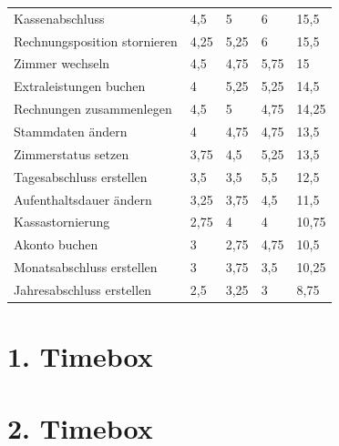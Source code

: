\documentclass[a4paper,12pt,twoside]{scrreprt}
\begin{document}
\begin{longtable}{|l|l|l|l|l|}
            Kassenabschluss              & 4,5               & 5                      & 6                   & 15,5   \\
            Rechnungsposition stornieren & 4,25              & 5,25                   & 6                   & 15,5   \\
            Zimmer wechseln              & 4,5               & 4,75                   & 5,75                & 15     \\
            Extraleistungen buchen       & 4                 & 5,25                   & 5,25                & 14,5   \\
            Rechnungen zusammenlegen     & 4,5               & 5                      & 4,75                & 14,25  \\
            Stammdaten ändern            & 4                 & 4,75                   & 4,75                & 13,5   \\
            Zimmerstatus setzen          & 3,75              & 4,5                    & 5,25                & 13,5   \\
            Tagesabschluss erstellen     & 3,5               & 3,5                    & 5,5                 & 12,5   \\
            Aufenthaltsdauer ändern      & 3,25              & 3,75                   & 4,5                 & 11,5   \\
            Kassastornierung             & 2,75              & 4                      & 4                   & 10,75  \\
            Akonto buchen                & 3                 & 2,75                   & 4,75                & 10,5   \\
            Monatsabschluss erstellen    & 3                 & 3,75                   & 3,5                 & 10,25  \\
            Jahresabschluss erstellen    & 2,5               & 3,25                   & 3                   & 8,75
            \hline
        \end{longtable}


    \section{1. Timebox}
        

    \section{2. Timebox}
        
\end{document}
